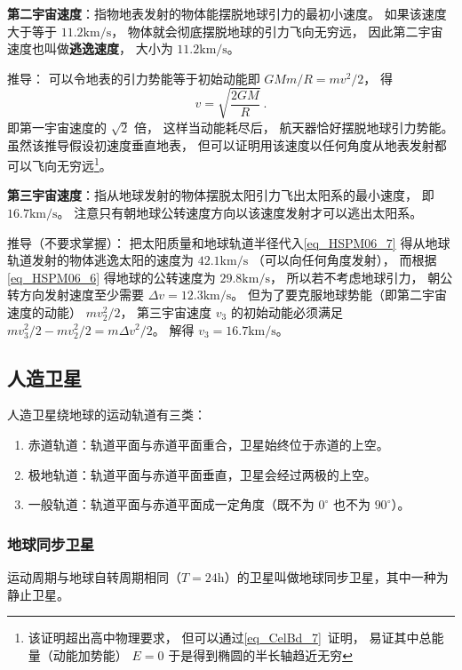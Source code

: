 \textbf{第二宇宙速度}：指物地表发射的物体能摆脱地球引力的最初小速度。 如果该速度大于等于 $11.2\mathrm{km/s}$， 物体就会彻底摆脱地球的引力飞向无穷远， 因此第二宇宙速度也叫做\textbf{逃逸速度}， 大小为 $11.2\mathrm{km/s}$。

推导： 可以令地表的引力势能等于初始动能即 $GMm/R = mv^2/2$， 得
\begin{equation}\label{eq_HSPM06_7}
v = \sqrt{\frac{2GM}{R}}~.
\end{equation}
即第一宇宙速度的 $\sqrt{2}$ 倍， 这样当动能耗尽后， 航天器恰好摆脱地球引力势能。 虽然该推导假设初速度垂直地表， 但可以证明用该速度以任何角度从地表发射都可以飞向无穷远\footnote{该证明超出高中物理要求， 但可以通过\autoref{eq_CelBd_7}~证明， 易证其中总能量（动能加势能） $E = 0$ 于是得到椭圆的半长轴趋近无穷}。

\textbf{第三宇宙速度}：指从地球发射的物体摆脱太阳引力飞出太阳系的最小速度， 即 $16.7\mathrm{km/s}$。 注意只有朝地球公转速度方向以该速度发射才可以逃出太阳系。

推导（不要求掌握）： 把太阳质量和地球轨道半径代入\autoref{eq_HSPM06_7} 得从地球轨道发射的物体逃逸太阳的速度为 $42.1\mathrm{km/s}$ （可以向任何角度发射）， 而根据\autoref{eq_HSPM06_6} 得地球的公转速度为 $29.8\mathrm{km/s}$， 所以若不考虑地球引力， 朝公转方向发射速度至少需要 $\Delta v = 12.3\mathrm{km/s}$。 但为了要克服地球势能（即第二宇宙速度的动能） $mv_2^2/2$， 第三宇宙速度 $v_3$ 的初始动能必须满足 $mv_3^2/2 - mv_2^2/2 = m\Delta v^2/2$。 解得 $v_3 = 16.7\mathrm{km/s}$。

\subsection{人造卫星}

人造卫星绕地球的运动轨道有三类：

\begin{enumerate}
\item 赤道轨道：轨道平面与赤道平面重合，卫星始终位于赤道的上空。
\item 极地轨道：轨道平面与赤道平面垂直，卫星会经过两极的上空。
\item 一般轨道：轨道平面与赤道平面成一定角度（既不为 $0^\circ$ 也不为 $90^\circ$）。
\end{enumerate}

\subsubsection{地球同步卫星}

运动周期与地球自转周期相同（$T=24\mathrm{h}$）的卫星叫做地球同步卫星，其中一种为静止卫星。

